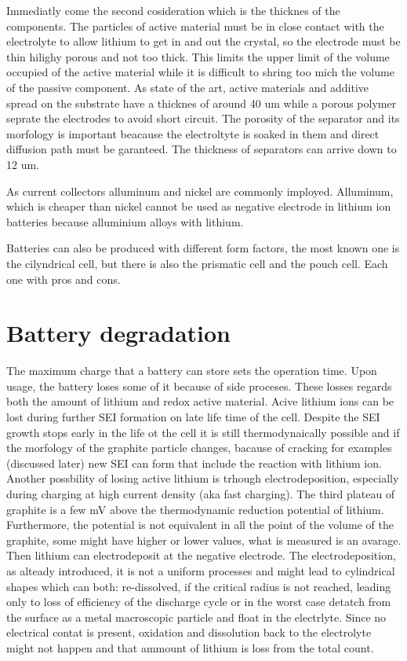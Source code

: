 Immediatly come the second cosideration which is the thicknes of the components. The particles of active material must be in close contact with the electrolyte to allow lithium to get in and out the crystal, so the electrode must be thin hilighy porous and not too thick. This limits the upper limit of the volume occupied of the active material while it is difficult to shring too mich the volume of the passive component. As state of the art, active materials and additive spread on the substrate have a thicknes of around 40 um while a porous polymer seprate the electrodes to avoid short circuit. The porosity of the separator and its morfology is important beacause the electroltyte is soaked in them and direct diffusion path must be garanteed. The thickness of separators can arrive down to 12 um. 

As current collectors alluminum and nickel are commonly imployed. Alluminum, which is cheaper than nickel cannot be used as negative electrode in lithium ion batteries because alluminium alloys with lithium.

Batteries can also be produced with different form factors, the most known one is the cilyndrical cell, but there is also the prismatic cell and the pouch cell. Each one with pros and cons.

\section{Battery degradation}

The maximum charge that a battery can store sets the operation time. Upon usage, the battery loses some of it because of side proceses. These losses regards both the amount of lithium and redox active material. Acive lithium ions can be lost during further SEI formation on late life time of the cell. Despite the SEI growth stops early in the life ot the cell it is still thermodynaically possible and if the morfology of the graphite particle changes, bacause of cracking for examples (discussed later) new SEI can form that include the reaction with lithium ion. Another possbility of losing active lithium is trhough electrodeposition, especially during charging at high current density (aka fast charging). The third plateau of graphite is a few mV above the thermodynamic reduction potential of lithium. Furthermore, the potential is not equivalent in all the point of the volume of the graphite, some might have higher or lower values, what is measured is an avarage. Then lithium can electrodeposit at the negative electrode. The electrodeposition, as alteady introduced, it is not a uniform processes and might lead to cylindrical shapes which can both: re-dissolved, if the critical radius is not reached, leading only to loss of efficiency of the discharge cycle or in the worst case detatch from the surface as a metal macroscopic particle and float in the electrlyte. Since no electrical contat is present, oxidation and dissolution back to the electrolyte might not happen and that ammount of lithium is loss from the total count.

